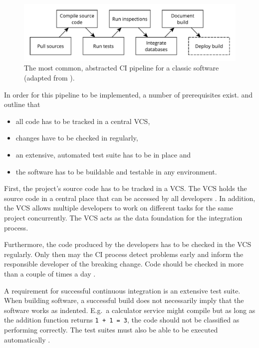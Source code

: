 \begin{figure}[H]
\begin{center}
  \includegraphics[scale=0.7]{images/figures/ci_classic.pdf}
\end{center}
\caption[The most common, abstracted \ac{CI} pipeline for a classic
software.]{The most common, abstracted \ac{CI} pipeline for a classic
software (adapted from \autocite[Fig. 1-4]{MatyasContinuousIntegration2007}).}%
\label{fig:ci_pipeline_classic}
\end{figure}

In order for this pipeline to be implemented, a number of prerequisites exist.
\autocite{MatyasContinuousIntegration2007} and
\autocite{JezHumbleContinuousDelivery2010} outline that

\begin{itemize}
  \item all code has to be tracked in a central \ac{VCS},
  \item changes have to be checked in regularly,
  \item an extensive, automated test suite has to be in place and
  \item the software has to be buildable and testable in any environment.
\end{itemize}

First, the project's source code has to be tracked in a \ac{VCS}. The \ac{VCS}
holds the source code in a central place that can be accessed by all developers
\autocite[Ch.  1]{MatyasContinuousIntegration2007}. In addition, the \ac{VCS}
allows multiple developers to work on different tasks for the same project
concurrently. The \ac{VCS} acts as the data foundation for the integration
process.

Furthermore, the code produced by the developers has to be checked in the
\ac{VCS} regularly. Only then may the \ac{CI} process detect problems early and
inform the responsible developer of the breaking change. Code should be checked
in more than a couple of times a day \autocite[p.
59]{JezHumbleContinuousDelivery2010}.

A requirement for successful continuous integration is an extensive test suite.
When building software, a successful build does not necessarily imply that the
software works as indented. E.g.\ a calculator service might compile but as
long as the addition function returns \texttt{1 + 1 = 3}, the code should not be
classified as performing correctly. The test suites must also be able to be
executed automatically \autocite[p. 60]{JezHumbleContinuousDelivery2010}.

